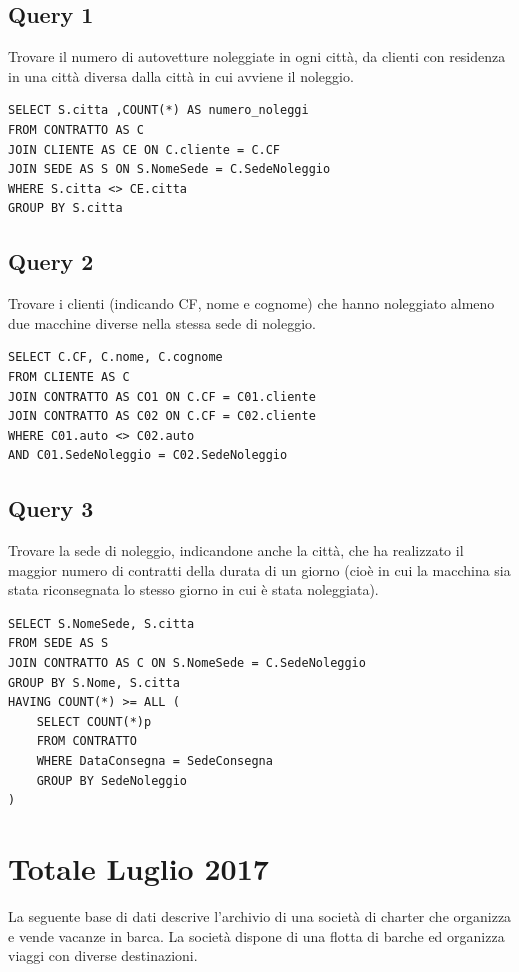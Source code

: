\subsection{Query 1}
Trovare il numero di autovetture noleggiate in ogni città, da clienti con residenza in una città diversa dalla città in cui avviene il noleggio.
\begin{lstlisting}
SELECT S.citta ,COUNT(*) AS numero_noleggi
FROM CONTRATTO AS C
JOIN CLIENTE AS CE ON C.cliente = C.CF
JOIN SEDE AS S ON S.NomeSede = C.SedeNoleggio
WHERE S.citta <> CE.citta
GROUP BY S.citta
\end{lstlisting}

\subsection{Query 2}
Trovare i clienti (indicando CF, nome e cognome) che hanno noleggiato almeno due macchine diverse nella stessa sede di noleggio.

\begin{lstlisting}
SELECT C.CF, C.nome, C.cognome
FROM CLIENTE AS C
JOIN CONTRATTO AS CO1 ON C.CF = C01.cliente
JOIN CONTRATTO AS C02 ON C.CF = C02.cliente
WHERE C01.auto <> C02.auto
AND C01.SedeNoleggio = C02.SedeNoleggio
\end{lstlisting}

\subsection{Query 3}
Trovare la sede di noleggio, indicandone anche la città, che ha realizzato il maggior numero di contratti della durata di un giorno (cioè in cui la macchina sia stata riconsegnata lo stesso giorno in cui è stata noleggiata).

\begin{lstlisting}
SELECT S.NomeSede, S.citta
FROM SEDE AS S
JOIN CONTRATTO AS C ON S.NomeSede = C.SedeNoleggio
GROUP BY S.Nome, S.citta
HAVING COUNT(*) >= ALL (
    SELECT COUNT(*)p
    FROM CONTRATTO
    WHERE DataConsegna = SedeConsegna
    GROUP BY SedeNoleggio
)
\end{lstlisting}

\newpage
\section{Totale Luglio 2017}
La seguente base di dati descrive l'archivio di una società di charter che organizza e vende vacanze in barca. La società dispone di una flotta di barche ed organizza viaggi con diverse destinazioni.

